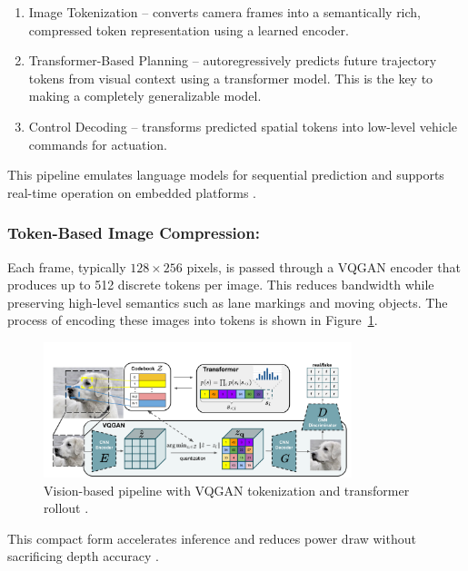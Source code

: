 \documentclass[12pt]{article}
\begin{document}
\begin{enumerate}[label=\alph*)]
  \item Image Tokenization – converts camera frames into a semantically rich, compressed token representation using a learned encoder.
  \item Transformer-Based Planning – autoregressively predicts future trajectory
		tokens from visual context using a transformer model. This is the key to
		making a completely generalizable model.
  \item Control Decoding – transforms predicted spatial tokens into low-level vehicle commands for actuation.
\end{enumerate}

This pipeline emulates language models for sequential prediction and supports real-time operation on embedded platforms \autocite{goff2025learningdriveworldmodel}.

\subsubsection{Token-Based Image Compression:}

Each frame, typically $128 \times 256$ pixels, is passed through a VQGAN encoder
that produces up to 512 discrete tokens per image. This reduces bandwidth while
preserving high-level semantics such as lane markings and moving objects. The
process of encoding these images into tokens is shown in
Figure~\ref{fig:tokenizer}.

\begin{figure}[H]
    \centering
    \includegraphics[width=0.8\textwidth]{architecture}
    \caption{Vision-based pipeline with VQGAN tokenization and transformer rollout \autocite{Esser2021TamingTransformersHighResolutionImage}.}
    \label{fig:tokenizer}
\end{figure}

This compact form accelerates inference and reduces power draw without sacrificing depth accuracy \autocite{Chen2024EndToEndAD}.
\end{document}

